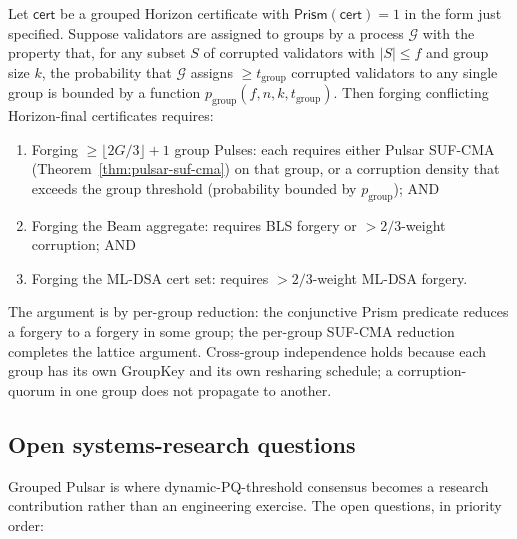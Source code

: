 \begin{theorem}
\label{thm:grouped-horizon-soundness}
Let $\mathsf{cert}$ be a grouped Horizon certificate with $\mathsf{Prism}(\mathsf{cert}) = 1$ in the form just specified. Suppose validators are assigned to groups by a process $\mathcal{G}$ with the property that, for any subset $S$ of corrupted validators with $|S| \leq f$ and group size $k$, the probability that $\mathcal{G}$ assigns $\geq t_{\mathrm{group}}$ corrupted validators to any single group is bounded by a function $p_{\mathrm{group}}(f, n, k, t_{\mathrm{group}})$. Then forging conflicting Horizon-final certificates requires:
\begin{enumerate}[leftmargin=2em,nosep]
  \item Forging $\geq \lfloor 2G/3 \rfloor + 1$ group Pulses: each requires either Pulsar SUF-CMA (Theorem~\ref{thm:pulsar-suf-cma}) on that group, or a corruption density that exceeds the group threshold (probability bounded by $p_{\mathrm{group}}$); AND
  \item Forging the Beam aggregate: requires BLS forgery or $> 2/3$-weight corruption; AND
  \item Forging the ML-DSA cert set: requires $> 2/3$-weight ML-DSA forgery.
\end{enumerate}
\end{theorem}

The argument is by per-group reduction: the conjunctive Prism predicate reduces a forgery to a forgery in some group; the per-group SUF-CMA reduction completes the lattice argument. Cross-group independence holds because each group has its own GroupKey and its own resharing schedule; a corruption-quorum in one group does not propagate to another.

\subsection{Open systems-research questions}

Grouped Pulsar is where dynamic-PQ-threshold consensus becomes a research contribution rather than an engineering exercise. The open questions, in priority order:


